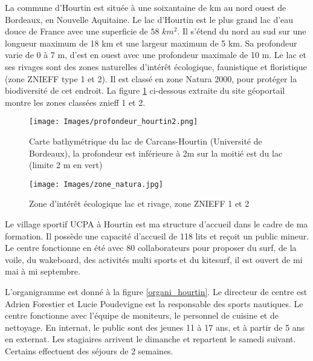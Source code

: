 \documentclass[11pt,a4paper]{report}
\begin{document}
La commune d'Hourtin est située à une soixantaine de km au nord ouest 
de Bordeaux, en Nouvelle Aquitaine. Le lac d'Hourtin est le plus grand
lac d'eau douce de France avec une superficie de $58 \,\,km^2$.
Il s'étend du nord au sud sur une longueur maximum de 18 km 
et une largeur maximum de 5 km. Sa profondeur varie de 0 à 7 m, 
d'est en ouest avec une profondeur maximale de 10 m.
Le lac et ses rivages sont des zones naturelles  d'intér\^et écologique, 
faunistique et floristique (zone ZNIEFF type 1 et 2). Il est classé
en zone  Natura 2000\cite{natura2000}, pour protéger la biodiversité
de cet endroit. La figure \ref{lac_znieff} ci-dessous extraite
du site géoportail\cite{geoportail} montre les zones classées znieff 1 et 2.


\begin{figure}
\begin{minipage}{0.4\textwidth}
\texttt{[image: Images/profondeur\_hourtin2.png]} 
\caption{Carte bathymétrique du lac de Carcans-Hourtin (Université de Bordeaux\cite{bathy}), la profondeur est inférieure
à 2m sur la moitié est du lac (limite 2 m en vert)\label{carte_profondeur}}
\end{minipage}
\hfill
\begin{minipage}{0.4\textwidth}
\texttt{[image: Images/zone\_natura.jpg]} 
\caption{Zone d'intér\^et écologique lac et rivage, zone ZNIEFF 1 et 2\label{lac_znieff}}
 \end{minipage}
\end{figure}

Le village sportif UCPA à Hourtin est ma structure d'accueil dans le cadre de
ma formation. Il possède une capacité d'accueil de 118 lits et reçoit un 
public mineur. Le centre fonctionne en été avec 80 collaborateurs pour
proposer du surf, de la voile, du wakeboard, des activités multi sports
et du kitesurf, il est ouvert de mi mai à mi septembre.
 

L'organigramme est donné à la figure \ref{organi_hourtin}.
Le directeur de centre est Adrien Forestier et 
Lucie Poudevigne est la responsable des sports nautiques.
Le centre fonctionne avec l'équipe de moniteurs, le personnel 
de cuisine et de nettoyage. En internat, le public sont des jeunes
11 à 17 ans, et  à partir de 5 ans  en externat.
Les stagiaires arrivent le dimanche et repartent
le samedi suivant. Certains effectuent des séjours de 2 semaines.
\end{document}
